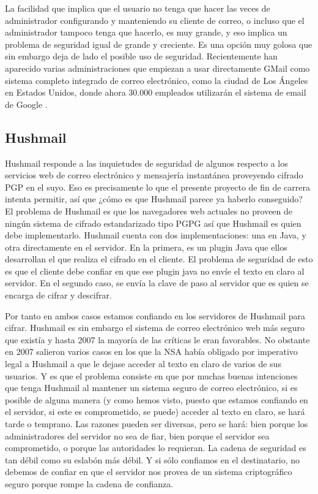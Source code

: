 La facilidad que implica que el usuario no tenga que hacer las veces de administrador configurando y manteniendo su cliente de correo, o incluso que el administrador tampoco tenga que hacerlo, es muy grande, y eso implica un problema de seguridad igual de grande y creciente. Es una opción muy golosa que sin embargo deja de lado el posible uso de seguridad. Recientemente han aparecido varias administraciones que empiezan a usar directamente GMail como sistema completo integrado de correo electrónico, como la ciudad de Los Ángeles en Estados Unidos, donde ahora 30.000 empleados utilizarán el sistema de email de Google \cite{gmail-losangeles}.

\subsection{Hushmail}\label{hushmail}

Hushmail responde a las inquietudes de seguridad de algunos respecto a los servicios web de correo electrónico y mensajería instantánea proveyendo cifrado PGP en el suyo. Eso es precisamente lo que el presente proyecto de fin de carrera intenta permitir, así que ¿cómo es que Hushmail parece ya haberlo conseguido? El problema de Hushmail es que los navegadores web actuales no proveen de ningún sistema de cifrado estandarizado tipo PGPG así que Hushmail es quien debe implementarlo. Hushmail cuenta con dos implementaciones: una en Java, y otra directamente en el servidor. En la primera, es un plugin Java que ellos desarrollan el que realiza el cifrado en el cliente. El problema de seguridad de esto es que el cliente debe confiar en que ese plugin java no envíe el texto en claro al servidor. En el segundo caso, se envía la clave de paso al servidor que es quien se encarga de cifrar y descifrar. 

Por tanto en ambos casos estamos confiando en los servidores de Hushmail para cifrar. Hushmail es sin embargo el sistema de correo electrónico web más seguro que existía y hasta 2007 la mayoría de las críticas le eran favorables. No obstante en 2007 salieron varios casos en los que la NSA había obligado por imperativo legal a Hushmail a que le dejase acceder al texto en claro de varios de sus usuarios. Y es que el problema consiste en que por muchas buenas intenciones que tenga Hushmail al mantener un sistema seguro de correo electrónico, si es posible de alguna manera (y como hemos visto, puesto que estamos confiando en el servidor, si este es comprometido, se puede) acceder al texto en claro, se hará tarde o temprano. Las razones pueden ser diversas, pero se hará: bien porque los administradores del servidor no sea de fiar, bien porque el servidor sea comprometido, o porque las autoridades lo requieran.  La cadena de seguridad es tan débil como su eslabón más débil. Y si sólo confiamos en el destinatario, no debemos de confiar en que el servidor nos provea de un sistema criptográfico seguro porque rompe la cadena de confianza.

